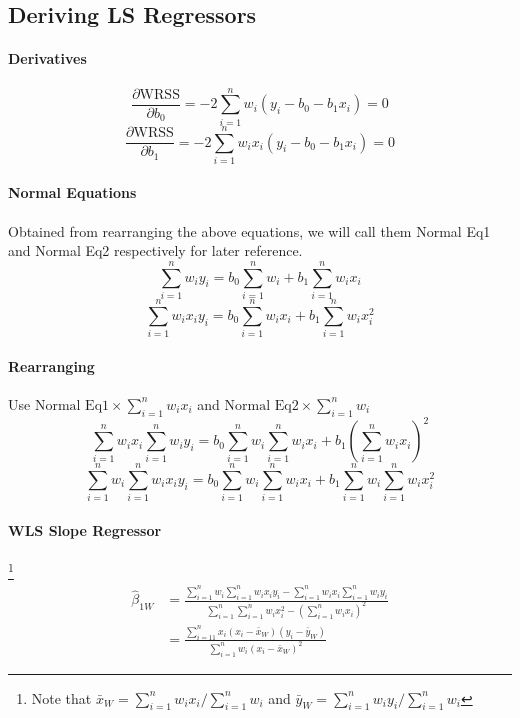 \documentclass[10pt]{article}
\begin{document}
\subsection{Deriving LS Regressors}
\paragraph{Derivatives}
\begin{equation}
    \frac{\partial \mathrm{WRSS}}{\partial b_{0}}=-2 \sum_{i=1}^{n} w_{i}\left(y_{i}-b_{0}-b_{1} x_{i}\right)=0
\end{equation}
\begin{equation}
    \frac{\partial \mathrm{WRSS}}{\partial b_{1}}=-2 \sum_{i=1}^{n} w_{i} x_{i}\left(y_{i}-b_{0}-b_{1} x_{i}\right)=0
\end{equation}
\paragraph{Normal Equations} Obtained from rearranging the above equations, we will call them Normal Eq1 and Normal Eq2 respectively for later reference.
\begin{equation}
    \sum_{i=1}^{n} w_{i} y_{i}=b_{0} \sum_{i=1}^{n} w_{i}+b_{1} \sum_{i=1}^{n} w_{i} x_{i}
\end{equation}
\begin{equation}
    \sum_{i=1}^{n} w_{i} x_{i} y_{i}=b_{0} \sum_{i=1}^{n} w_{i} x_{i}+b_{1} \sum_{i=1}^{n} w_{i} x_{i}^{2}
\end{equation}
\paragraph{Rearranging} Use $\text{Normal Eq1} \times\sum_{i=1}^{n} w_{i} x_{i}$ and $\text{Normal Eq2}\times\sum_{i=1}^{n} w_{i}$
\begin{equation}
    \sum_{i=1}^{n} w_{i} x_{i} \sum_{i=1}^{n} w_{i} y_{i}=b_{0} \sum_{i=1}^{n} w_{i} \sum_{i=1}^{n} w_{i} x_{i}+b_{1}\left(\sum_{i=1}^{n} w_{i} x_{i}\right)^{2}
\end{equation}
\begin{equation}
    \sum_{i=1}^{n} w_{i} \sum_{i=1}^{n} w_{i} x_{i} y_{i}=b_{0} \sum_{i=1}^{n} w_{i} \sum_{i=1}^{n} w_{i} x_{i}+b_{1} \sum_{i=1}^{n} w_{i} \sum_{i=1}^{n} w_{i} x_{i}^{2}
\end{equation}
\paragraph{WLS Slope Regressor} \footnote{Note that $\bar{x}_{W}=\sum_{i=1}^{n} w_{i} x_{i} / \sum_{i=1}^{n} w_{i}$ and $\bar{y}_{W}=\sum_{i=1}^{n} w_{i} y_{i} / \sum_{i=1}^{n} w_{i}$}
\begin{align}
    \hat{\beta}_{1W} &= \frac{\sum_{i=1}^{n} w_{i} \sum_{i=1}^{n} w_{i} x_{i} y_{i}-\sum_{i=1}^{n} w_{i} x_{i} \sum_{i=1}^{n} w_{i} y_{i}}{\sum_{i=1}^{n} \sum_{i=1}^{n} w_{i} x_{i}^{2}-\left(\sum_{i=1}^{n} w_{i} x_{i}\right)^{2}} \\
    &= \frac{\sum_{i=11}^{n} x_{i}\left(x_{i}-\bar{x}_{W}\right)\left(y_{i}-\bar{y}_{W}\right)}{\sum_{i=1}^{n} w_{i}\left(x_{i}-\bar{x}_{W}\right)^{2}}
\end{align}
\end{document}
